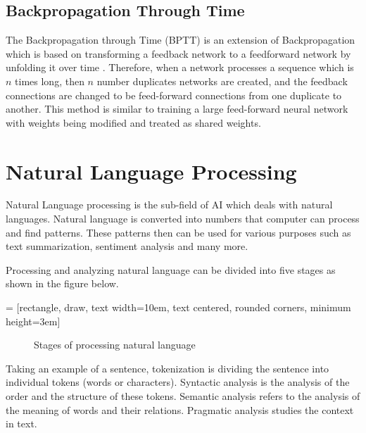 \subsection{Backpropagation Through Time}
The Backpropagation through Time (BPTT) is an extension of Backpropagation which is based on transforming a feedback network to a feedforward network by unfolding it over time \cite{ahmad2004recurrent}. Therefore, when a network processes a sequence which is $n$ times long, then $n$ number duplicates networks are created, and the feedback connections are changed to be feed-forward connections from one duplicate to another. This method is similar to training a large feed-forward neural network with weights being modified and treated as shared weights.

\section{Natural Language Processing}
Natural Language processing is the sub-field of \gls{AI} which deals with natural languages. Natural language is converted into numbers that computer can process and find patterns. These patterns then can be used for various purposes such as text summarization, sentiment analysis and many more.

Processing and analyzing natural language can be divided into five stages \cite{indurkhya2010handbook} as shown in the figure below.

 = [rectangle, draw, text width=10em, text centered, rounded      corners, minimum height=3em]
\begin{figure}[!ht]
\centering
{}
\caption{Stages of processing natural language}
\label{fig:Stages of processing natural language}
\end{figure}

Taking an example of a sentence, tokenization is dividing the sentence into individual tokens (words or characters). Syntactic analysis is the analysis of the order and the structure of these tokens. Semantic analysis refers to the analysis of the meaning of words and their relations. Pragmatic analysis studies the context in text.  

